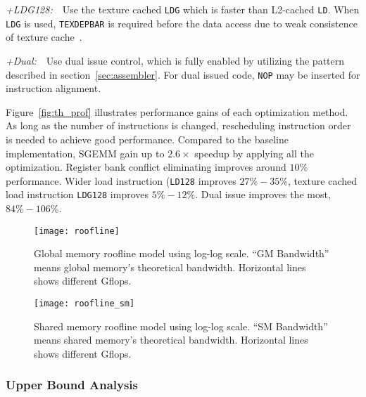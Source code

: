 {\it +LDG128:}~~Use the texture cached {\tt LDG} which is faster than L2-cached {\tt LD}. 
When {\tt LDG} is used, {\tt TEXDEPBAR} is required before the data access due to weak consistence of texture cache~\cite{lukyanov2014efficient}.

{\it +Dual:}~~Use dual issue control, which is fully enabled by utilizing the pattern described in section~\ref{sec:assembler}.
For dual issued code, {\tt NOP} may be inserted for instruction alignment.

Figure~\ref{fig:th_prof} illustrates performance gains of each optimization method.
As long as the number of instructions is changed, rescheduling instruction order is needed to achieve good performance.
Compared to the baseline implementation, SGEMM gain up to $2.6\times$ speedup by applying all the optimization.
Register bank conflict eliminating improves around $10\%$ performance. 
Wider load instruction ({\tt LD128} improves $27\%-35\%$, texture cached
load instruction {\tt LDG128} improves $5\%-12\%$.
Dual issue improves the most, $84\%-106\%$.


\begin{figure}[htbp]
\begin{center}
\texttt{[image: roofline]}
    \caption{Global memory roofline model using log-log scale. ``GM Bandwidth'' means global memory's theoretical bandwidth. Horizontal lines shows different Gflops.}
\label{fig:roofline_global}
\end{center}
\end{figure}

\begin{figure}[htbp]
\begin{center}
\texttt{[image: roofline\_sm]}
    \caption{Shared memory roofline model using log-log scale. ``SM Bandwidth'' means shared memory's theoretical bandwidth. Horizontal lines shows different Gflops.}
\label{fig:roofline_shared}
\end{center}
\end{figure}

\subsubsection{Upper Bound Analysis}


